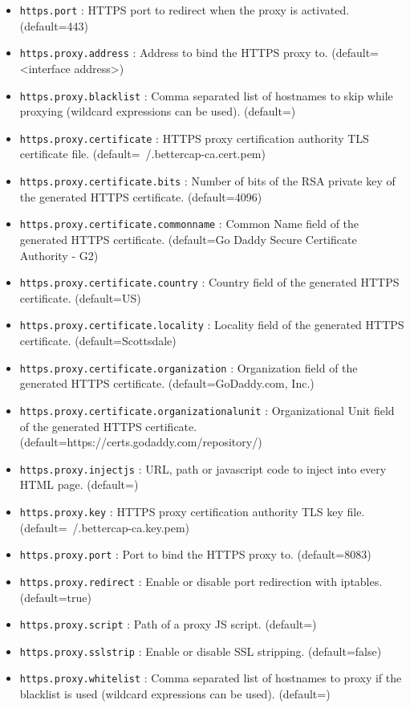 \begin{itemize}
 \item \verb|https.port| : HTTPS port to redirect when the proxy is activated. (default=443)
 \item \verb|https.proxy.address| : Address to bind the HTTPS proxy to. (default=<interface address>)
 \item \verb|https.proxy.blacklist| : Comma separated list of hostnames to skip while proxying (wildcard expressions can be used). (default=)
 \item \verb|https.proxy.certificate| : HTTPS proxy certification authority TLS certificate file. (default=~/.bettercap-ca.cert.pem)
 \item \verb|https.proxy.certificate.bits| : Number of bits of the RSA private key of the generated HTTPS certificate. (default=4096)
 \item \verb|https.proxy.certificate.commonname| : Common Name field of the generated HTTPS certificate. (default=Go Daddy Secure Certificate Authority - G2)
 \item \verb|https.proxy.certificate.country| : Country field of the generated HTTPS certificate. (default=US)
 \item \verb|https.proxy.certificate.locality| : Locality field of the generated HTTPS certificate. (default=Scottsdale)
 \item \verb|https.proxy.certificate.organization| : Organization field of the generated HTTPS certificate. (default=GoDaddy.com, Inc.)
 \item \verb|https.proxy.certificate.organizationalunit| : Organizational Unit field of the generated HTTPS certificate. \newline(default=https://certs.godaddy.com/repository/)
 \item \verb|https.proxy.injectjs| : URL, path or javascript code to inject into every HTML page. (default=)
 \item \verb|https.proxy.key| : HTTPS proxy certification authority TLS key file. (default=~/.bettercap-ca.key.pem)
 \item \verb|https.proxy.port| : Port to bind the HTTPS proxy to. (default=8083)
 \item \verb|https.proxy.redirect| : Enable or disable port redirection with iptables. (default=true)
 \item \verb|https.proxy.script| : Path of a proxy JS script. (default=)
 \item \verb|https.proxy.sslstrip| : Enable or disable SSL stripping. (default=false)
 \item \verb|https.proxy.whitelist| : Comma separated list of hostnames to proxy if the blacklist is used (wildcard expressions can be used). (default=)
\end{itemize}

